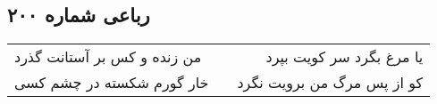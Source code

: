 \begin{center}
\section*{رباعی شماره ۲۰۰}
\label{sec:sh200}
\begin{longtable}{l p{0.5cm} r}
من زنده و کس بر آستانت گذرد
&&
یا مرغ بگرد سر کویت بپرد
\\
خار گورم شکسته در چشم کسی
&&
کو از پس مرگ من برویت نگرد
\\
\end{longtable}
\end{center}
